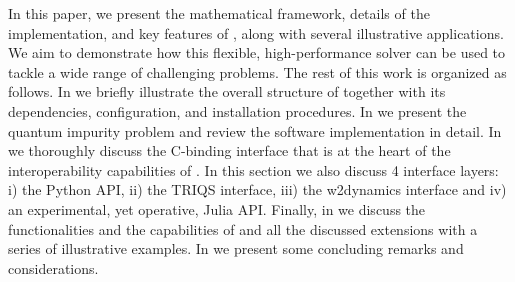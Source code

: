 \documentclass[edipack_sp.tex]{subfiles}
\begin{document}
In this paper, we present the mathematical framework, details of the implementation, and key features of \NAME, along with several illustrative applications. We aim to demonstrate how this flexible,
high-performance solver can be used to tackle a wide range of
challenging problems. 
The rest of this work is organized as follows. In  we 
briefly illustrate the overall structure of \NAME together with its dependencies, configuration, and installation procedures. In  we present the quantum impurity
problem and review the software implementation in detail. In  we thoroughly discuss the C-binding interface that is at the heart of the 
interoperability capabilities of \NAME. In this section we also discuss 4 interface layers: i) 
the Python API, ii) the TRIQS interface, iii) the w2dynamics interface and iv) an experimental, yet operative, Julia API.
Finally, in  we discuss the functionalities and the capabilities of \NAME and  all the discussed extensions with a series of illustrative examples. 
In  we present some concluding remarks and considerations. 

\ifSubfilesClassLoaded{
  
}{}
\end{document}
